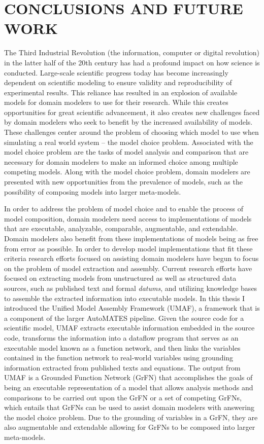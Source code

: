 \chapter{CONCLUSIONS AND FUTURE WORK\label{chapter:conc_and_future}}
The Third Industrial Revolution (the information, computer or digital revolution) in the latter half of the 20th century has had a profound impact on how science is conducted.
Large-scale scientific progress today has become increasingly dependent on scientific modeling to ensure validity and reproducibility of experimental results.
This reliance has resulted in an explosion of available models for domain modelers to use for their research.
While this creates opportunities for great scientific advancement, it also creates new challenges faced by domain modelers who seek to benefit by the increased availability of models.
These challenges center around the problem of choosing which model to use when simulating a real world system -- the model choice problem.
Associated with the model choice problem are the tasks of model analysis and comparison that are necessary for domain modelers to make an informed choice among multiple competing models.
Along with the model choice problem, domain modelers are presented with new opportunities from the prevalence of models, such as the possibility of composing models into larger meta-models.

In order to address the problem of model choice and to enable the process of model composition, domain modelers need access to implementations of models that are executable, analyzable, comparable, augmentable, and extendable.
Domain modelers also benefit from these implementations of models being as free from error as possible.
In order to develop model implementations that fit these criteria research efforts focused on assisting domain modelers have begun to focus on the problem of model extraction and assembly.
Current research efforts have focused on extracting models from unstructured as well as structured data sources, such as published text and formal \textit{datums}, and utilizing knowledge bases to assemble the extracted information into executable models.
In this thesis I introduced the Unified Model Assembly Framework (UMAF), a framework that is a component of the larger AutoMATES pipeline.
Given the source code for a scientific model, UMAF extracts executable information embedded in the source code, transforms the information into a dataflow program that serves as an executable model known as a function network, and then links the variables contained in the function network to real-world variables using grounding information extracted from published texts and equations.
The output from UMAF is a Grounded Function Network (GrFN) that accomplishes the goals of being an executable representation of a model that allows analysis methods and comparisons to be carried out upon the GrFN or a set of competing GrFNs, which entails that GrFNs can be used to assist domain modelers with answering the model choice problem.
Due to the grounding of variables in a GrFN, they are also augmentable and extendable allowing for GrFNs to be composed into larger meta-models.

